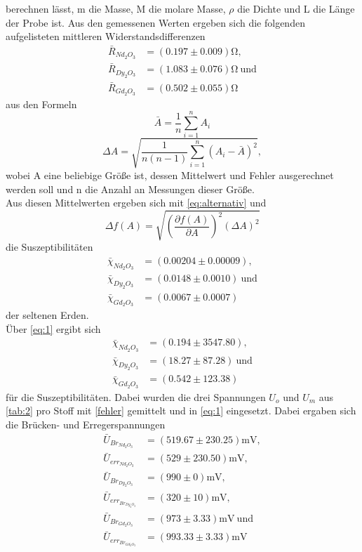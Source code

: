 berechnen lässt, m die Masse, M die molare Masse, $\rho$ die Dichte und L die Länge der Probe ist.
Aus den gemessenen Werten ergeben sich die folgenden aufgelisteten mittleren Widerstandsdifferenzen
\begin{align*}
  \bar R_{Nd_2 O_3}&=(0.197 \pm 0.009) \si{\ohm},\\
  \bar R_{Dy_2 O_3}&=(1.083 \pm 0.076) \si{\ohm}\ \textrm{und}\\
  \bar R_{Gd_2 O_3}&=(0.502 \pm 0.055) \si{\ohm}
\end{align*}
aus den Formeln
\begin{equation*}
  \bar A=\frac{1}{n}\sum_{i=1}^n A_i
  \label{eq:fehler}
\end{equation*}
\begin{equation*}
  \Delta A=\sqrt{\frac{1}{n(n-1)}\sum_{i=1}^n (A_i - \bar A)^2},
\end{equation*}
wobei A eine beliebige Größe ist, dessen Mittelwert und Fehler ausgerechnet werden soll und n die Anzahl an Messungen dieser Größe.\\
Aus diesen Mittelwerten ergeben sich mit \autoref{eq:alternativ} und    
\begin{equation}
  \Delta f(A)=\sqrt{\left(\frac{\partial f(A)}{\partial A}\right)^2 (\Delta A)^2}
  \label{gauß}
\end{equation}
die Suszeptibilitäten 
\begin{align*}
  \bar \chi_{Nd_2 O_3}&=(0.00204 \pm 0.00009),\\
  \bar \chi_{Dy_2 O_3}&=(0.0148 \pm 0.0010)\ \textrm{und}\\
  \bar \chi_{Gd_2 O_3}&=(0.0067 \pm 0.0007)
\end{align*}
der seltenen Erden.\\
Über \eqref{eq:1} ergibt sich 
\begin{align*}
  \bar \chi_{Nd_2 O_3}&=(0.194 \pm 3547.80),\\
  \bar \chi_{Dy_2 O_3}&=(18.27 \pm 87.28)\ \textrm{und}\\
  \bar \chi_{Gd_2 O_3}&=(0.542 \pm 123.38)
\end{align*}
für die Suszeptibilitäten. Dabei wurden die drei Spannungen $U_{o}$ und $U_{m}$ aus \autoref{tab:2} pro Stoff mit \autoref{fehler} gemittelt und in \eqref{eq:1} eingesetzt. Dabei ergaben sich die Brücken- und Erregerspannungen
\begin{align*}
  \bar U_{Br_{Nd_2 O_3}}&=(519.67 \pm 230.25) \textrm{mV},\\
  \bar U_{err_{Nd_2 O_3}}&=(529 \pm 230.50) \textrm{mV},\\
  \bar U_{Br_{Dy_2 O_3}}&=(990 \pm 0) \textrm{mV},\\
  \bar U_{err_{Br_{Dy_2 O_3}}}&=(320 \pm 10) \textrm{mV},\\
  \bar U_{Br_{Gd_2 O_3}}&=(973 \pm 3.33) \textrm{mV}\ \textrm{und}\\
  \bar U_{err_{Br_{Gd_2 O_3}}}&=(993.33 \pm 3.33) \textrm{mV}
\end{align*}
